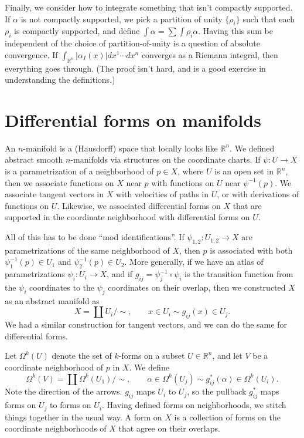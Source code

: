 \documentclass[12pt]{amsbook}
\newcommand{\be}{\begin{equation}}
\newcommand{\ee}{\end{equation}}
\newcommand{\R}{{\mathbb R}}
\theoremstyle{definition}
\begin{document}
Finally, we consider how to integrate something that isn't compactly supported.
If $\alpha$ is not compactly supported, we pick a partition 
of unity $\{\rho_i\}$ such that each $\rho_i$ is compactly supported, and 
define $\int \alpha = \sum \int \rho_i \alpha$. Having this sum be independent
of the choice of partition-of-unity is a question of absolute convergence. 
If $\int_{\R^n} |\alpha_I(x)| dx^1 \cdots dx^n$ converges as a Riemann integral,
then everything goes through. (The proof isn't hard, and is a good exercise
in understanding the definitions.) 


\section{Differential forms on manifolds}

An $n$-manifold is a (Hausdorff) space that locally looks like $\R^n$.
We defined abstract smooth $n$-manifolds via structures on the coordinate
charts. If $\psi: U \to X$ is a parametrization of a neighborhood of 
$p \in X$, where $U$ is an open set in $\R^n$, then we associate functions
on $X$ near $p$ with functions on $U$ near $\psi^{-1}(p)$. We associate 
tangent vectors in $X$ with velocities of paths in $U$, or with derivations
of functions on $U$. Likewise, we associated differential forms on $X$ that
are supported in the coordinate neighborhood with differential forms on $U$. 

All of this has to be done ``mod identifications''.  If $\psi_{1,2}: U_{1,2}
\to X$ are parametrizations of the same neighborhood of $X$, then $p$ is 
associated with both $\psi_1^{-1}(p) \in U_1$ and $\psi_2^{-1}(p) \in U_2$.
More generally, if we have an atlas of parametrizations $\psi_i: U_i \to X$,
and if $g_{ij} = \psi_j^{-1} \circ \psi_i$ is the transition function from the
$\psi_i$ coordinates to the $\psi_j$ coordinates on their overlap, then we
constructed $X$ as an abstract manifold as 
\be X = \coprod U_i / \sim, \qquad x \in U_i \sim g_{ij}(x) \in U_j. \ee
We had a similar construction for tangent vectors, and we can do the same
for differential forms. 

Let $\Omega^k(U)$ denote the set of $k$-forms on a subset $U \in \R^n$, and
let $V$ be a coordinate neighborhood of $p$ in $X$. We define
\be \label{forms-on-X} 
\Omega^k(V) = \coprod \Omega^k(U_1)/\sim, \qquad \alpha \in \Omega^k(U_j)
\sim g_{ij}^*(\alpha) \in \Omega^k(U_i). \ee
Note the direction of the arrows. $g_{ij}$ maps $U_i$ to $U_j$, so 
the pullback $g_{ij}^*$ maps forms on $U_j$ to forms on $U_i$. Having defined
forms on neighborhoods, we stitch things together in the usual way. 
A form on $X$ is a collection of forms on
the coordinate neighborhoods of $X$ that agree on their overlaps. 
\end{document}
